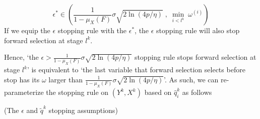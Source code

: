 \documentclass[11pt,review,authoryear]{elsarticle}
\begin{document}
\begin{appendices}
\begin{itemize}
  \begin{equation}
    \epsilon^* \in \left( \frac{1}{1 - \mu_X \left( F \right)} \sigma \sqrt{ 2 \ln \left(4p / \eta \right)} \; , \; \min_{i < l^k} \; \omega^{\left( i \right)} \right) \label{eqn:omega_epsilon}
  \end{equation}
  If we equip the $\epsilon$ stopping rule with the $\epsilon^*$, the $\epsilon$ stopping rule will also stop forward selection at stage $l^k$.
\end{itemize}
\medskip

\noindent
Hence, `the $\epsilon > \frac{1}{1 - \mu_X \left( F \right)} \sigma \sqrt{ 2 \ln \left(4p / \eta \right)}$ stopping rule stops forward selection at stage $l^k$' is equivalent to `the last variable that forward selection selects before stop has its $\omega$ larger than $\frac{1}{1-\mu_{X}\left(F\right)}\sigma\sqrt{2\ln\left(4p/\eta\right)}$'. As such, we can re-parameterize the stopping rule on $\left(Y^{k},X^{k}\right)$ based on $\widehat{q}_{i}^{k}$ as follows
%
\begin{definition}
  (The $\epsilon$ and $\widetilde{q}^k$ stopping assumptions) \label{def:stopping assumption}
\end{definition}


\end{appendices}
\end{document}
